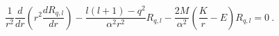 \begin{equation}
\frac1{r^2}\frac d{dr}\left(r^2\frac{dR_{q,l}}{dr}\right)-\frac{l(l+1)-q^2}
{\alpha^2r^2}R_{q,l}-\frac{2M}{\alpha^2}\left(\frac Kr-E\right)R_{q,l}=0 \ .
\end{equation} 
